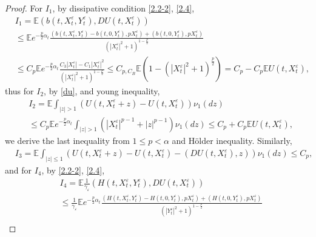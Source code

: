 \documentclass[11pt,reqno]{amsart}
\numberwithin{equation}{section}
\begin{document}
\begin{proof}
	For $I_{1}$, by dissipative condition  \eqref{2.2-2},  \eqref{2.4},
	\begin{equation}\label{3.10}
		\begin{split}
			&I_{1}=\mathbb{E} ( b(t,X_{t}^{\varepsilon},Y_{t}^{\varepsilon}),DU(t,X_{t}^{\varepsilon}))\\
			& \leq \mathbb{E} e^{-\frac{p}{2}\alpha_{t}} \frac{( b(t,X_{t}^{\varepsilon},Y_{t}^{\varepsilon})-b(t,0,Y_{t}^{\varepsilon}),pX_{t}^{\varepsilon}) +( b(t,0,Y_{t}^{\varepsilon}),pX_{t}^{\varepsilon})}{(|X_{t}^{\varepsilon}|^{2}+1)^{1-\frac{p}{2}}}\\
			&\leq C_{p}\mathbb{E}e^{-\frac{p}{2}\alpha_{t}} \frac{C_{3}|X_{t}^{\varepsilon}|-C_{1}|X_{t}^{\varepsilon}|^{2}}{(|X_{t}^{\varepsilon}|^{2}+1)^{1-\frac{p}{2}}}\leq C_{p,C_{B}} \mathbb{E}\left( 1-(|X_{t}^{\varepsilon}|^{2}+1)^{\frac{p}{2}}\right)=C_{p}-C_{p}\mathbb{E}U(t,X_{t}^{\varepsilon}), 
		\end{split}
	\end{equation}
	thus for $I_{2}$, by \eqref{du}, and young inequality,
	\begin{equation}\label{3.11}
		\begin{split}
		&I_{2}=\mathbb{E} \int_{|z|> 1}\left( U(t,X_{t}^{\varepsilon}+z)-U(t,X_{t}^{\varepsilon}) \right) \nu_{1}(dz)\\
	& \leq C_{p}\mathbb{E}e^{-\frac{p}{2}\alpha_{t}}\int_{|z|> 1}\left(|X_{t}^{\varepsilon}|^{p-1}+|z|^{p-1} \right) \nu_{1}(dz) \leq C_{p} +C_{p}\mathbb{E}U(t,X_{t}^{\varepsilon}),
		\end{split}
	\end{equation}
	we derive the last inequality from $1\leq p<\alpha$ and H\"{o}lder inequality. Similarly, 
	\begin{equation}\label{3.12}
		\begin{split}
			&I_{3}=\mathbb{E} \int_{|z|\leq 1}\left( U(t,X_{t}^{\varepsilon}+z)-U(t,X_{t}^{\varepsilon})-( DU(t,X_{t}^{\varepsilon}),z )\right)  \nu_{1}(dz)\leq C_{p},
		\end{split}
	\end{equation}
	and for $I_{4}$,  by  \eqref{2.2-2},  \eqref{2.4},
	\begin{equation}\label{3.13}
		\begin{split}
			&I_{4}=\mathbb{E} \frac{1}{\gamma_{\varepsilon}}( H(t,X_{t}^{\varepsilon},Y_{t}^{\varepsilon}),DU(t,X_{t}^{\varepsilon}))\\
			& \leq \frac{1}{\gamma_{\varepsilon}} \mathbb{E} e^{-\frac{p}{2}\alpha_{t}} \frac{( H(t,X_{t}^{\varepsilon},Y_{t}^{\varepsilon})-H(t,0,Y_{t}^{\varepsilon}),pX_{t}^{\varepsilon}) +( H(t,0,Y_{t}^{\varepsilon}),pX_{t}^{\varepsilon})}{(|Y_{t}^{\varepsilon}|^{2}+1)^{1-\frac{p}{2}}}\\

\end{split}
\end{equation}
\end{proof}
\end{document}
